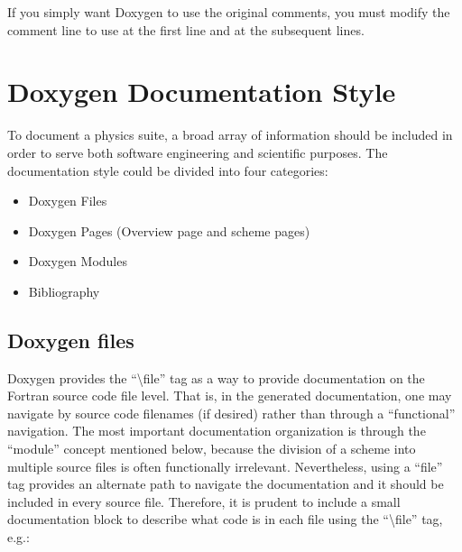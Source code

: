 \documentclass[letterpaper,10pt,english]{sphinxmanual}
\begin{document}
\begin{sphinxVerbatim}[commandchars=\\\{\}]
         
                 
                 
              
\end{sphinxVerbatim}

If you simply want Doxygen to use the original comments, you must modify the comment
line to use  at the first line and  at the subsequent lines.


\section{Doxygen Documentation Style}
\label{\detokenize{ScientificDocRules:doxygen-documentation-style}}
To document a physics suite, a broad array of information should be included
in order to serve both software engineering and scientific purposes. The
documentation style could be divided into four categories:
\begin{itemize}
\item {} 
Doxygen Files

\item {} 
Doxygen Pages (Overview page and scheme pages)

\item {} 
Doxygen Modules

\item {} 
Bibliography

\end{itemize}


\subsection{Doxygen files}
\label{\detokenize{ScientificDocRules:doxygen-files}}
Doxygen provides the “\textbackslash{}file” tag as a way to provide documentation on the
Fortran source code file level. That is, in the generated documentation,
one may navigate by source code filenames (if desired) rather than through
a “functional” navigation. The most important documentation organization is
through the “module” concept mentioned below, because the division of a scheme
into multiple source files is often functionally irrelevant. Nevertheless,
using a “file” tag provides an alternate path to navigate the documentation
and it should be included in every source file. Therefore, it is prudent to
include a small documentation block to describe what code is in each file
using the “\textbackslash{}file” tag, e.g.:
\end{document}
